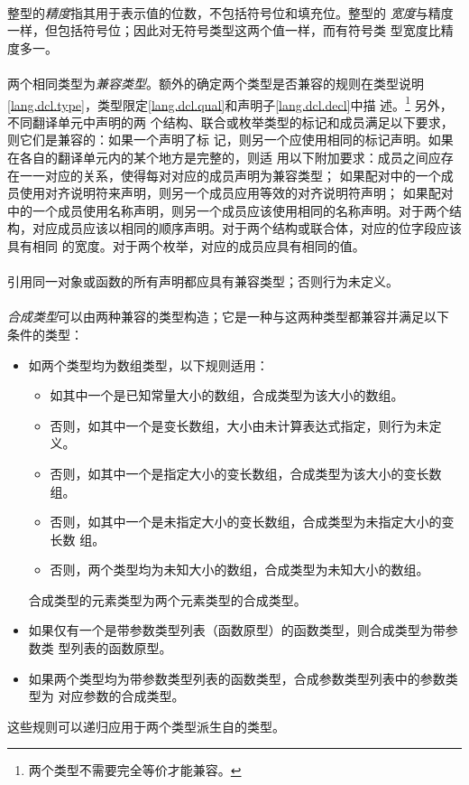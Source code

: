 {\paragraph{}
整型的\textit{精度}指其用于表示值的位数，不包括符号位和填充位。整型的
\textit{宽度}与精度一样，但包括符号位；因此对无符号类型这两个值一样，而有符号类
型宽度比精度多一。

\paragraph{}
两个相同类型为\textit{兼容类型}。额外的确定两个类型是否兼容的规则在类型说明
\ref{lang.dcl.type}，类型限定\ref{lang.dcl.qual}和声明子\ref{lang.dcl.decl}中描
述。\footnote{两个类型不需要完全等价才能兼容。} 另外，不同翻译单元中声明的两
个结构、联合或枚举类型的标记和成员满足以下要求，则它们是兼容的：如果一个声明了标
记，则另一个应使用相同的标记声明。如果在各自的翻译单元内的某个地方是完整的，则适
用以下附加要求：成员之间应存在一一对应的关系，使得每对对应的成员声明为兼容类型；
如果配对中的一个成员使用对齐说明符来声明，则另一个成员应用等效的对齐说明符声明；
如果配对中的一个成员使用名称声明，则另一个成员应该使用相同的名称声明。对于两个结
构，对应成员应该以相同的顺序声明。对于两个结构或联合体，对应的位字段应该具有相同
的宽度。对于两个枚举，对应的成员应具有相同的值。

\paragraph{}
引用同一对象或函数的所有声明都应具有兼容类型；否则行为未定义。

\paragraph{}
\textit{合成类型}可以由两种兼容的类型构造；它是一种与这两种类型都兼容并满足以下
条件的类型：
\begin{itemize}
  \item{如两个类型均为数组类型，以下规则适用：
    \begin{itemize}
      \item{如其中一个是已知常量大小的数组，合成类型为该大小的数组。}
      \item{否则，如其中一个是变长数组，大小由未计算表达式指定，则行为未定义。}
      \item{否则，如其中一个是指定大小的变长数组，合成类型为该大小的变长数组。}
      \item{否则，如其中一个是未指定大小的变长数组，合成类型为未指定大小的变长数
        组。}
      \item{否则，两个类型均为未知大小的数组，合成类型为未知大小的数组。}
    \end{itemize}
    合成类型的元素类型为两个元素类型的合成类型。}
  \item{如果仅有一个是带参数类型列表（函数原型）的函数类型，则合成类型为带参数类
    型列表的函数原型。}
  \item{如果两个类型均为带参数类型列表的函数类型，合成参数类型列表中的参数类型为
    对应参数的合成类型。}
\end{itemize}
这些规则可以递归应用于两个类型派生自的类型。

}
